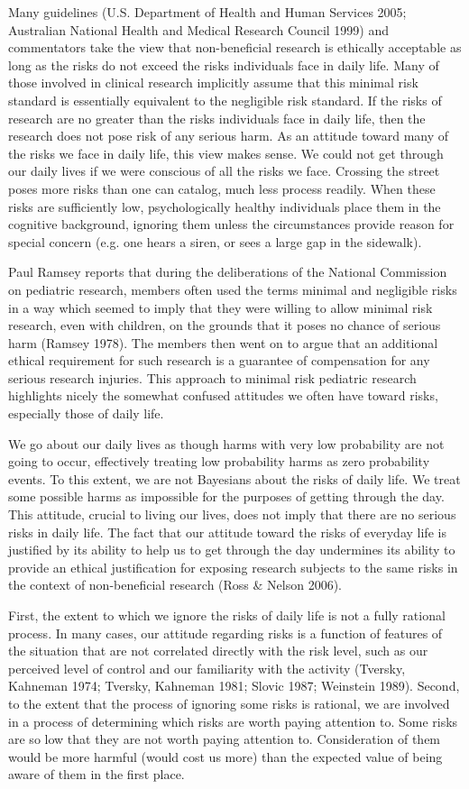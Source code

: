 \documentclass[12p]{article}
\begin{document}
Many guidelines (U.S. Department of Health and Human Services 2005; Australian National Health and Medical Research Council 1999) and commentators take the view that non-beneficial research is ethically acceptable as long as the risks do not exceed the risks individuals face in daily life. Many of those involved in clinical research implicitly assume that this minimal risk standard is essentially equivalent to the negligible risk standard. If the risks of research are no greater than the risks individuals face in daily life, then the research does not pose risk of any serious harm. As an attitude toward many of the risks we face in daily life, this view makes sense. We could not get through our daily lives if we were conscious of all the risks we face. Crossing the street poses more risks than one can catalog, much less process readily. When these risks are sufficiently low, psychologically healthy individuals place them in the cognitive background, ignoring them unless the circumstances provide reason for special concern (e.g. one hears a siren, or sees a large gap in the sidewalk).

Paul Ramsey reports that during the deliberations of the National Commission on pediatric research, members often used the terms minimal and negligible risks in a way which seemed to imply that they were willing to allow minimal risk research, even with children, on the grounds that it poses no chance of serious harm (Ramsey 1978). The members then went on to argue that an additional ethical requirement for such research is a guarantee of compensation for any serious research injuries. This approach to minimal risk pediatric research highlights nicely the somewhat confused attitudes we often have toward risks, especially those of daily life.

We go about our daily lives as though harms with very low probability are not going to occur, effectively treating low probability harms as zero probability events. To this extent, we are not Bayesians about the risks of daily life. We treat some possible harms as impossible for the purposes of getting through the day. This attitude, crucial to living our lives, does not imply that there are no serious risks in daily life. The fact that our attitude toward the risks of everyday life is justified by its ability to help us to get through the day undermines its ability to provide an ethical justification for exposing research subjects to the same risks in the context of non-beneficial research (Ross & Nelson 2006).

First, the extent to which we ignore the risks of daily life is not a fully rational process. In many cases, our attitude regarding risks is a function of features of the situation that are not correlated directly with the risk level, such as our perceived level of control and our familiarity with the activity (Tversky, Kahneman 1974; Tversky, Kahneman 1981; Slovic 1987; Weinstein 1989). Second, to the extent that the process of ignoring some risks is rational, we are involved in a process of determining which risks are worth paying attention to. Some risks are so low that they are not worth paying attention to. Consideration of them would be more harmful (would cost us more) than the expected value of being aware of them in the first place.
\end{document}
